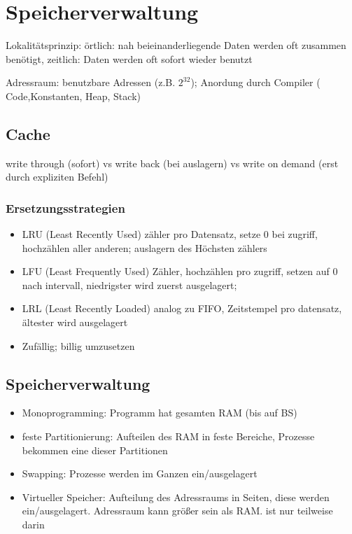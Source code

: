 \section*{Speicherverwaltung}
Lokalitätsprinzip: örtlich: nah beieinanderliegende Daten werden oft zusammen benötigt, zeitlich: Daten werden oft sofort wieder benutzt

Adressraum: benutzbare Adressen (z.B. $2^{32}$); Anordung durch Compiler ( Code,Konstanten, Heap, Stack)

\subsection*{Cache}
write through (sofort) vs write back (bei auslagern) vs write on demand (erst durch expliziten Befehl)

\subsubsection*{Ersetzungsstrategien}
\begin{itemize}
\item LRU (Least Recently Used) zähler pro Datensatz, setze 0 bei zugriff, hochzählen aller anderen; auslagern des Höchsten zählers
\item LFU (Least Frequently Used) Zähler, hochzählen pro zugriff, setzen auf 0 nach intervall, niedrigster wird zuerst ausgelagert;
\item LRL (Least Recently Loaded) analog zu FIFO, Zeitstempel pro datensatz, ältester wird ausgelagert
\item Zufällig; billig umzusetzen
\end{itemize}


\subsection*{Speicherverwaltung}
\begin{itemize}
\item Monoprogramming: Programm hat gesamten RAM (bis auf BS)
\item feste Partitionierung: Aufteilen des RAM in feste Bereiche, Prozesse bekommen eine dieser Partitionen
\item Swapping: Prozesse werden im Ganzen ein/ausgelagert
\item Virtueller Speicher: Aufteilung des Adressraums in Seiten, diese werden ein/ausgelagert. Adressraum kann größer sein als RAM. ist nur teilweise darin
\end{itemize}

